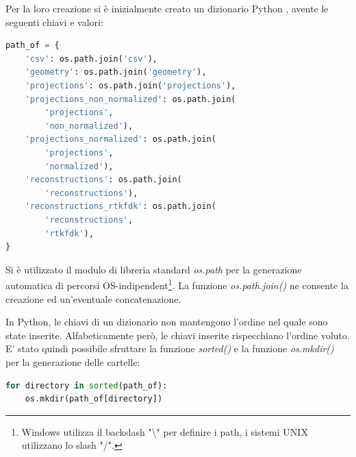 \documentclass[a4paper,12pt, doubleside]{report}
\begin{document}
            \bigskip
             
            \bigskip
            \par
                Per la loro creazione si è inizialmente creato un dizionario Python \cite{python-dictionary}, avente le seguenti chiavi e valori:  
                        
                \begin{lstlisting}[language=python, frame=bt]
path_of = {
    'csv': os.path.join('csv'),
    'geometry': os.path.join('geometry'),
    'projections': os.path.join('projections'),
    'projections_non_normalized': os.path.join(
        'projections',
        'non_normalized'),
    'projections_normalized': os.path.join(
        'projections',
        'normalized'),
    'reconstructions': os.path.join(
        'reconstructions'),
    'reconstructions_rtkfdk': os.path.join(
        'reconstructions',
        'rtkfdk'),
}
                \end{lstlisting}
                        
                Si è utilizzato il modulo di libreria standard \textit{os.path} \cite{os-path} per la generazione automatica di percorsi OS-indipendent\footnote{Windows utilizza il backslash "\textbackslash" per definire i path, i sistemi UNIX utilizzano lo slash "/".}. La funzione \textit{os.path.join()} \cite{os-path-join} ne consente la creazione ed un'eventuale concatenazione. 
            
            \bigskip
            \par
                In Python, le chiavi di un dizionario non mantengono l'ordine nel quale sono state inserite. Alfabeticamente però, le chiavi inserite rispecchiano l'ordine voluto. E' stato quindi possibile sfruttare la funzione \textit{sorted()} \cite{python-sorted} e la funzione \textit{os.mkdir()} \cite{os-mkdir} per la generazione delle cartelle:
                        
                \begin{lstlisting}[language=python, frame=bt]
for directory in sorted(path_of):
    os.mkdir(path_of[directory])
                \end{lstlisting}
                        
\end{document}
